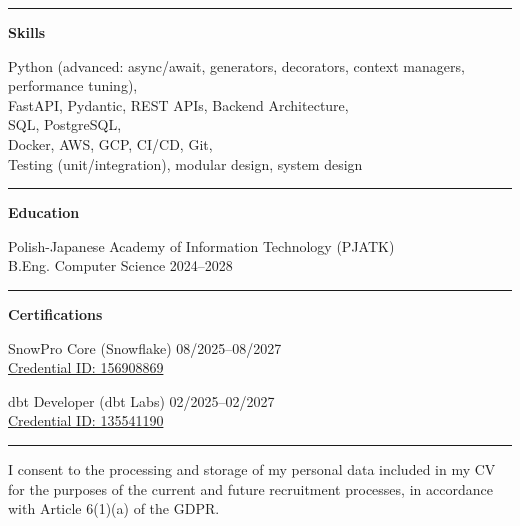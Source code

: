 \documentclass[11pt,a4paper]{article}
\begin{document}
\rule{\textwidth}{0.5pt}

\textbf{Skills}

Python (advanced: async/await, generators, decorators, context managers, performance tuning), \\
FastAPI, Pydantic, REST APIs, Backend Architecture, \\
SQL, PostgreSQL, \\
Docker, AWS, GCP, CI/CD, Git, \\
Testing (unit/integration), modular design, system design

\rule{\textwidth}{0.5pt}

\textbf{Education}

Polish-Japanese Academy of Information Technology (PJATK) \\
B.Eng. Computer Science \hfill 2024--2028

\rule{\textwidth}{0.5pt}

\textbf{Certifications}

SnowPro Core (Snowflake) \hfill 08/2025--08/2027 \\
\href{https://achieve.snowflake.com/31ea4326-9e88-4148-a8b5-20326f786e50}{Credential ID: 156908869}

dbt Developer (dbt Labs) \hfill 02/2025--02/2027 \\
\href{https://credentials.getdbt.com/75e67339-1260-4bb4-bb4e-efbb9c0bc774}{Credential ID: 135541190}

\rule{\textwidth}{0.5pt}

{\small
I consent to the processing and storage of my personal data included in my CV for the purposes of the current and future recruitment processes, in accordance with Article 6(1)(a) of the GDPR.
}
\end{document}

